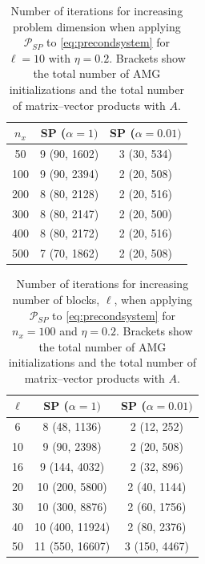 \documentclass{article}
\theoremstyle{definition}
\begin{document}
{		
		\begin{table}[!htb]
			
			\centering
			\begin{tabular}{c|c|c}
				$n_x$ & SP ($\alpha = 1)$ & SP ($\alpha = 0.01)$\\
				\hline
				50 & 9	(90, 1602)&	3	(30,	534)\\
				100&9	(90,	2394)	&2	(20,	508)\\
				200& 8	(80,	2128)	&2	(20,	516)\\
				300& 8	(80,	2147)	&2	(20,	500)\\
				400 & 8	(80,	2172) &2	(20,	516)\\
				500 & 7	(70,	1862)&	2	(20, 508)
			\end{tabular}
			\vspace{4mm}
			\caption{Number of iterations for increasing problem dimension when applying $\mathcal{P}_{SP}$ to \eqref{eq:precondsystem} for $\ell = 10$ with $\eta=0.2$. Brackets show the total number of AMG initializations and the total number of matrix--vector products with $A$. \label{tab:nx_scalingAMG}} 
		\end{table}
		
		\begin{table}
			\centering
			\begin{tabular}{c|c|c}
				$\ell$ & SP ($\alpha = 1)$ & SP ($\alpha = 0.01)$\\
				\hline
				6 &8	(48,	1136) &	2	(12,	252)\\
				10& 9	(90,	2398)	&2	(20,	508)\\
				16& 9	(144, 4032)	&2	(32,	896)\\
				20& 10	(200,	5800)	&2	(40,	1144)\\
				30 & 10	(300,	8876)	&2	(60,	1756)\\
				40&10	(400,	11924)	&2	(80,	2376)\\
				50& 11	(550,	16607)	&3	(150,	4467)
			\end{tabular}
			\caption{Number of  iterations for increasing number of blocks, $\ell$, when applying $\mathcal{P}_{SP}$ to \eqref{eq:precondsystem} for $n_x=100$ and $\eta=0.2$. Brackets show the total number of AMG initializations and the total number of matrix--vector products with $A$.  \label{tab:AMGscalingwithl}}
		\end{table}
		
		
		
}
\end{document}
